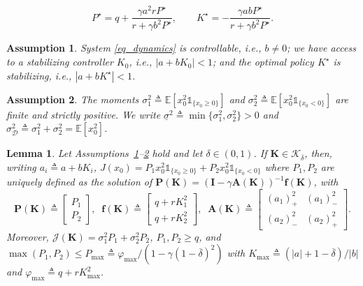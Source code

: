 \documentclass[10pt,a4paper]{amsart}
\newtheorem{assumption}{Assumption}
\newtheorem{lemma}{Lemma}
\newcommand{\E}{\mathbb{E}}
\newcommand{\bA}{\mathbf{A}}
\newcommand{\bI}{\mathbf{I}}
\newcommand{\bK}{\mathbf{K}}
\newcommand{\bP}{\mathbf{P}}
\newcommand{\cD}{\mathcal{D}}
\newcommand{\cJ}{\mathcal{J}}
\newcommand{\cK}{\mathcal{K}}
\newcommand{\ind}[1]{\mathds{1}_{#1}}
\newcommand{\mbf}{\mathbf{f}}
\newcommand{\slo}{\underline{\sigma}}
\begin{document}
\begin{equation}\label{eq_riccati}
    P^{\star}=q+\frac{\gamma a^{2}rP^{\star}}{r+\gamma b^{2}P^{\star}},
    \qquad K^{\star}=-\frac{\gamma abP^{\star}}{r+\gamma b^{2}P^{\star}}.
\end{equation}

\begin{assumption} \label{assumption_controllability}
    System \eqref{eq_dynamics} is controllable, i.e., $b \neq 0$; we have access to a stabilizing controller $K_{0}$, i.e., $| a + b K_{0} | < 1$; and the optimal policy $K^{\star}$ is stabilizing, i.e., $|a + b K^{\star}| < 1$.
\end{assumption}

\begin{assumption} \label{assumption_initial_distribution}
    The moments
    $\sigma_{1}^{2} \triangleq \E[x_{0}^{2}\ind{\{x_{0} \ge 0\}}]$ and
    $\sigma_{2}^{2} \triangleq \E[x_{0}^{2}\ind{\{x_{0} < 0\}}]$
    are finite and strictly positive. We write
    $\slo^{2} {\triangleq} \min\{\sigma_{1}^{2}, \sigma_{2}^{2}\} {>} 0$ and
    $\sigma_{\cD}^{2} {\triangleq} \sigma_{1}^{2} + \sigma_{2}^{2} {=} \E[x_{0}^{2}]$.
\end{assumption}

\begin{lemma} \label{lemma_state_value_function}
   Let Assumptions~\ref{assumption_controllability}--\ref{assumption_initial_distribution} hold and let $\delta \in (0, 1)$. If $\bK\in \cK_{\overline{\delta}}$, then, writing $a_i\triangleq a+bK_i$, $J(x_{0}) = P_{1} x_{0}^2 \ind{\{x_0 \ge 0\}} + P_{2} x_{0}^2 \ind{\{x_0 < 0\}}$ where $P_{1}, P_{2}$ are uniquely defined as the solution of $\bP(\bK) = (\bI - \gamma \bA(\bK) )^{-1} \mbf(\bK)$, with
    {\small
    \begin{equation}
        \bP(\bK) {\triangleq}
        \begin{bmatrix}
            P_{1} \\
            P_{2}
        \end{bmatrix},\;\;
        \mbf(\bK) {\triangleq}
        \begin{bmatrix}
            q + rK_{1}^2 \\
            q + rK_{2}^2
        \end{bmatrix},\;\;
        \bA(\bK) {\triangleq}
        \begin{bmatrix}
            (a_{1})_{+}^2 & (a_{1})_{-}^2 \\
            (a_{2})_{-}^2 & (a_{2})_{+}^2
        \end{bmatrix}.
    \end{equation}
    }Moreover, $\cJ(\bK) = \sigma_{1}^{2} P_{1} + \sigma_{2}^{2} P_{2}$, $P_{1}, P_{2} \ge q$, and $\max(P_{1}, P_{2}) \le P_{\max} \triangleq \varphi_{\max} / (1 - \gamma(1 - \overline{\delta})^2)$ with $K_{\max} \triangleq (|a| + 1 - \overline{\delta}) / |b|$ and $\varphi_{\max} \triangleq q + rK_{\max}^2$.
\end{lemma}
\end{document}
